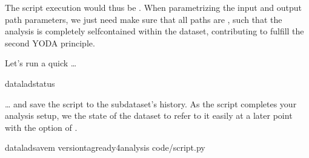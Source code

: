 \sphinxAtStartPar
The script execution would thus be .
When parametrizing the input and output path parameters, we just need make sure that all paths  are , such that the  analysis is completely self\sphinxhyphen{}contained within the dataset, contributing to fulfill the second YODA principle.

\sphinxAtStartPar
Let’s run a quick …

\begin{sphinxVerbatim}[commandchars=\\\{\}]
dataladstatus
\end{sphinxVerbatim}

\ignorespaces 
\sphinxAtStartPar
… and save the script to the subdataset’s history. As the script completes your
analysis setup, we  the state of the dataset to refer to it easily at a later
point with the  option of .

\begin{sphinxVerbatim}[commandchars=\\\{\}]
dataladsave\PYGZhy{}m
\PYGZhy{}\PYGZhy{}version\PYGZhy{}tagready4analysis
code/script.py
\end{sphinxVerbatim}


